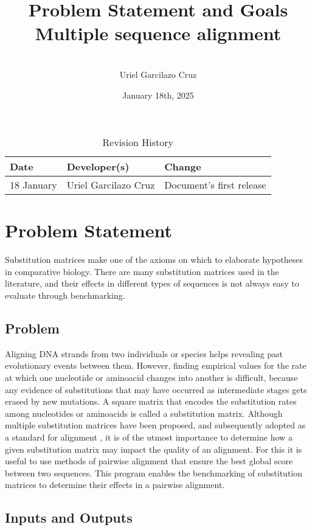 \documentclass{article}
\title{Problem Statement and Goals\\Multiple sequence alignment}
\author{\\Uriel Garcilazo Cruz}
\date{January 18th, 2025}
\begin{document}
\maketitle

\begin{table}[hp]
\caption{Revision History} \label{TblRevisionHistory}
\begin{tabularx}{\textwidth}{llX}
\toprule
\textbf{Date} & \textbf{Developer(s)} & \textbf{Change}\\
\midrule
18 January & Uriel Garcilazo Cruz & Document's first release\\
\bottomrule
\end{tabularx}
\end{table}

\section{Problem Statement}

Substitution matrices make one of the axioms on which to elaborate hypotheses in comparative biology.
There are many substitution matrices used in the literature, 
and their effects in different types of sequences is not always easy to evaluate through benchmarking.

\subsection{Problem}

Aligning DNA strands from two individuals or species helps revealing past evolutionary events between them.
However, finding empirical values for the rate at which one nucleotide or aminoacid changes into another is difficult,
because any evidence of substitutions that may have occurred as intermediate stages gets erased by new mutations.
A square matrix that encodes the substitution rates among nucleotides or aminoacids is called a substitution matrix.
Although multiple substitution matrices have been proposed, and subsequently adopted as a standard for alignment \cite{Altschul1991,Mount2008},
it is of the utmost importance to determine how a given substitution matrix may impact the quality of an alignment.
For this it is useful to use methods of pairwise alignment \cite{NEEDLEMAN1970443} that ensure the best global score between two sequences.
This program enables the benchmarking of substitution matrices to determine their effects in a pairwise alignment.


\subsection{Inputs and Outputs}
\end{document}
